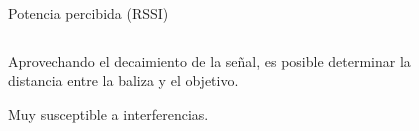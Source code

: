 \documentclass[xcolor=table]{beamer}
\begin{document}
    \begin{frame}{Potencia percibida (RSSI)}
      \begin{columns}
        \begin{column}{0.5\textwidth}
          Aprovechando el decaimiento de la señal, es posible determinar la distancia entre la baliza y el objetivo.

          \vspace{0.5cm}
          Muy susceptible a interferencias.
        \end{column}
        \begin{column}{0.5\textwidth}  
          \begin{figure}[H]
            \centering
            \def\svgwidth{\linewidth}
            
            \label{fig:TOA}
        \end{figure}
        \end{column}
        \end{columns}
    \end{frame}


\end{document}
